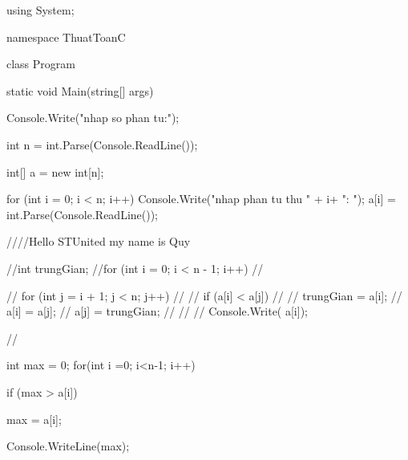 using System;

namespace ThuatToanC
{
    class Program
    {
        static void Main(string[] args)
        {
            Console.Write("nhap so phan tu:");

            int n = int.Parse(Console.ReadLine());

            int[] a = new int[n];


            for (int i = 0; i < n; i++)
            {
                Console.Write("nhap phan tu thu " + i+ ": ");
                a[i] = int.Parse(Console.ReadLine());
            }

             ////Hello STUnited my name is Quy 

            //int trungGian;
            //for (int i = 0; i < n - 1; i++)
            //{
            //    for (int j = i + 1; j < n; j++)
            //    {
            //        if (a[i] < a[j])
            //        {
            //            trungGian = a[i];
            //            a[i] = a[j];
            //            a[j] = trungGian;
            //        }
            //    }
            //    Console.Write( a[i]);

            //}

             int max = 0;
            for(int i =0; i<n-1; i++)
            {
               
                if (max > a[i])
                {
                    max = a[i];
                    
                }
                Console.WriteLine(max);
            }

        }
    }
}

